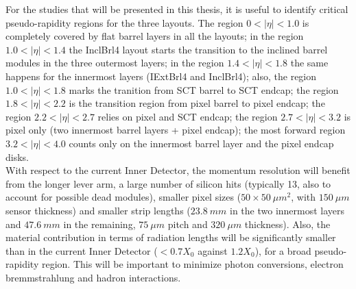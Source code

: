 \documentclass[a4paper,twoside,12pt]{book}
\begin{document}
\begin{table} [h]
\centering
	\caption{For the three Step-1 layouts considered, values of the barrel layers radii in the Pixel and SCT layers. The second pixel layer is 75 mm only for the ExtBrl4 layout, and is 
	85 mm in the IExtBrl4 and InclBrl4 layouts.}
	\label{tab:tracking:barrelRadii}
\end{table}

For the studies that will be presented in this thesis, it is useful to identify critical pseudo-rapidity regions for the three layouts. The region $0 < |\eta| < 1.0$ is completely covered by
flat barrel layers in all the layouts; in the region $1.0 < |\eta| < 1.4$ the InclBrl4 layout starts the transition to the inclined barrel modules in the three outermost layers; in the
region $1.4 < |\eta| < 1.8$ the same happens for the innermost layers (IExtBrl4 and InclBrl4); also, the region $1.0 < |\eta| < 1.8$ marks the tranition from SCT barrel to SCT endcap; the region $1.8 < |\eta| < 2.2$ is the transition region from pixel barrel to pixel endcap; the region $2.2 < |\eta| < 2.7$ relies on pixel and SCT endcap; the region $2.7 < |\eta| < 3.2$  is pixel only (two innermost barrel layers + pixel endcap); the most forward region $3.2 < |\eta| < 4.0$ counts only on the innermost barrel layer and the pixel endcap disks.\\

With respect to the current Inner Detector, the momentum resolution will benefit from the longer lever arm, a large number of silicon hits (typically 13, also to account for
possible dead modules), smaller pixel sizes ($50 \times 50\ \mu m^2$, with $150\ \mu m$ sensor thickness) and smaller strip lengths ($23.8\ mm$ in the two innermost
layers and $47.6\ mm$ in the remaining, $75\ \mu m$ pitch and $320\ \mu m$ thickness)\cite{scoping}. Also, the material contribution in terms of radiation lengths 
will be significantly smaller than in the current Inner Detector ($< 0.7 X_{0}$ against $1.2 X_{0}$), for a broad pseudo-rapidity region. This will be important to minimize
photon conversions, electron bremmstrahlung and hadron interactions. \\
\end{document}

